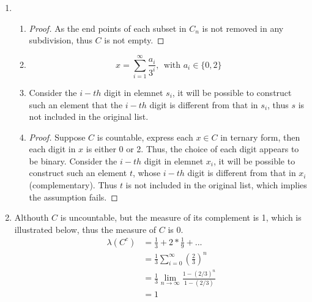 \documentclass[paper=a4, fontsize=11pt]{scrartcl} %
\numberwithin{equation}{section} %
\numberwithin{figure}{section} %
\numberwithin{table}{section} %
\begin{document}
\begin{enumerate}
\begin{enumerate}
\begin{proof}
					\end{proof}
			\end{enumerate}
		\item 
			\begin{enumerate}
				\item 
					\begin{proof}
						As the end points of each subset in $C_n$ is not removed in any subdivision, thus $C$ is not empty.
					\end{proof}
				\item 
					\begin{equation}
						x = \sum_{i=1}^{\infty} \frac{a_i}{3^i}, \ \ \text{with $a_i \in \{0, 2\}$}
					\end{equation}
				\item 
					Consider the $i-th$ digit in elemnet $s_i$, it will be possible to construct such an element that the $i-th$ digit is different from that in $s_i$, thus $s$ is not included in the original list.
				\item 
					\begin{proof}
						Suppose $C$ is countable, express each $x \in C$ in ternary form, then each digit in $x$ is either 0 or 2. Thus, the choice of each digit appears to be binary. Consider the $i-th$ digit in elemnet $x_i$, it will be possible to construct such an element $t$, whose $i-th$ digit is different from that in $x_i$(complementary). Thus $t$ is not included in the original list, which implies the assumption fails.
					\end{proof}
			\end{enumerate}
		
		\item 
			Althouth $C$ is uncountable, but the measure of its complement is 1, which is illustrated below, thus the measure of $C$ is 0.		
			\begin{equation}
				\begin{aligned}
					\lambda(C^c) & = \frac{1}{3} + 2 * \frac{1}{9} + ... \\
					             & = \frac{1}{3}\sum_{i=0}^{\infty} (\frac{2}{3})^n\\
					             & = \frac{1}{3} \lim\limits_{n\rightarrow\infty}\frac{1-(2/3)^n}{1-(2/3)}\\
					             & = 1
          		\end{aligned}
			\end{equation} 
		
	\end{enumerate}
\end{document}
